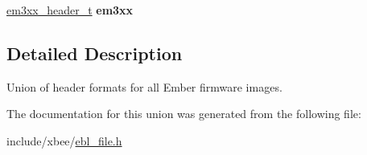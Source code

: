 \begin{DoxyCompactItemize}
\item 
\hypertarget{unionebl__file__header__t_a0587c0600affa009707209ba2e5edbf3}{\hyperlink{structem3xx__header__t}{em3xx\-\_\-header\-\_\-t} {\bfseries em3xx}}\label{unionebl__file__header__t_a0587c0600affa009707209ba2e5edbf3}

\end{DoxyCompactItemize}


\subsection{Detailed Description}
Union of header formats for all Ember firmware images. 

The documentation for this union was generated from the following file\-:\begin{DoxyCompactItemize}
\item 
include/xbee/\hyperlink{ebl__file_8h}{ebl\-\_\-file.\-h}\end{DoxyCompactItemize}
